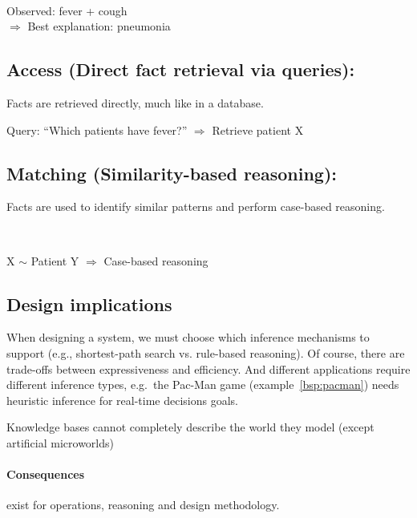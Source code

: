 
\begin{bsp}
    $\ $
    \begin{center}
        Observed: fever + cough \\
        $\Rightarrow$ Best explanation: pneumonia
    \end{center}
\end{bsp}

\subsection*{Access (Direct fact retrieval via queries):}
Facts are retrieved directly, much like in a database.
\begin{bsp}
    Query: ``Which patients have fever?'' $\Rightarrow$ Retrieve patient X
\end{bsp}

\subsection*{Matching (Similarity-based reasoning):} Facts are used to identify similar patterns and perform case-based reasoning.

\begin{bsp}
    $\ $
    \begin{center}
        X $\sim$ Patient Y $\Rightarrow$ Case-based reasoning
    \end{center}
\end{bsp}

\subsection*{Design implications}
When designing a system, we must choose which inference mechanisms to support (e.g., shortest-path search vs.
rule-based reasoning).
Of course, there are trade-offs between expressiveness and efficiency.
And different applications require different inference types, e.g.\ the Pac-Man game (example~\ref{bsp:pacman}) needs
heuristic inference for real-time decisions goals.




\begin{beo}
    \label{obs:incompleteness}
    Knowledge bases cannot completely describe the world they model
    (except artificial microworlds)

    \paragraph{Consequences} exist for operations, reasoning and design methodology.
\end{beo}

